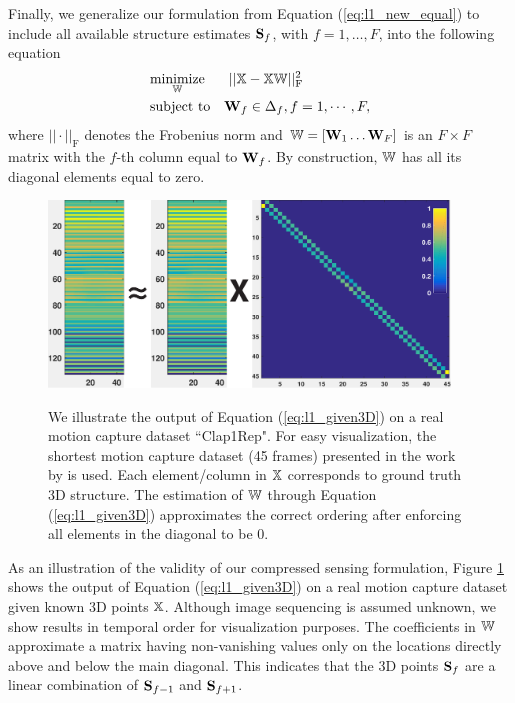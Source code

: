 Finally, we generalize our formulation from Equation (\ref{eq:l1_new_equal}) to include all available structure estimates $\mathbf S_f$, with  $f=1,\dotsc,F$, into the following equation
\begin{equation}
\begin{aligned}
& \underset{\mathbb W}{\text{minimize}}&& ~ || \mathbb X - \mathbb X \mathbb W||_\text{F}^2\\
& \text{subject to} && \mathbf W_f \in \Delta_f, f=1,\cdots,F,
\end{aligned}
\label{eq:l1_given3D}
\end{equation}
where $||\cdot||_\text{F}$ denotes the Frobenius norm and $\mathbb W=[\mathbf W_1 \dots \mathbf W_F]$ is an $F\times F$ matrix
with the $f$-th column equal to $\mathbf W_f$.
By construction, $\mathbb W$ has all its diagonal elements equal to zero.

\begin{figure}
  \centering
  \includegraphics[width=0.95\textwidth]{chapter5/resource/l1.pdf}\\
  \caption[Illustration of the self-expressive prior.]{We illustrate the output of Equation (\ref{eq:l1_given3D}) on a real motion capture dataset ``Clap1Rep". 
For easy visualization, the shortest motion capture dataset (45 frames) presented in the work by \citet{cg-2007-2} is used. Each element/column in $\mathbb X$  corresponds to  ground truth 3D structure. The estimation of $\mathbb W$ through Equation (\ref{eq:l1_given3D}) approximates the correct ordering after enforcing all elements in the diagonal to be $0$.}
  \label{fig:principle}
\end{figure}

As an illustration of the validity of our compressed sensing formulation, Figure \ref{fig:principle} shows the output of Equation (\ref{eq:l1_given3D}) on a real motion capture dataset given known 3D points $\mathbb X$. 
Although image sequencing is assumed unknown, we show results in temporal order for visualization purposes.
The coefficients in $\mathbb W$ approximate a matrix having non-vanishing values only on the locations directly above and below the main diagonal.
This indicates that the 3D points $\mathbf S_f$ are a linear combination of $\mathbf S_{f-1}$ and $\mathbf S_{f+1}$. 

